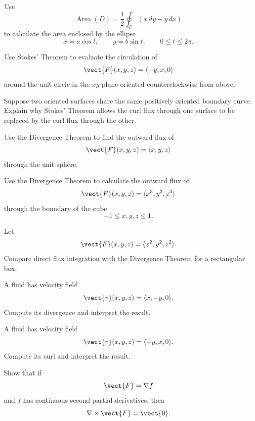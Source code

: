 \begin{exercise}[3]
Use
\[ \operatorname{Area}(D)
=
\frac12\oint_C(x\,dy-y\,dx) \]
to calculate the area enclosed by the ellipse
\[ x=a\cos t,\qquad y=b\sin t,\qquad0\leq t\leq2\pi. \]
\end{exercise}

\begin{exercise}[2]
Use Stokes' Theorem to evaluate the circulation of
\[ \vect{F}(x,y,z)=\langle-y,x,0\rangle \]
around the unit circle in the \(xy\)-plane oriented counterclockwise from
above.
\end{exercise}

\begin{exercise}[2]
Suppose two oriented surfaces share the same positively oriented boundary
curve. Explain why Stokes' Theorem allows the curl flux through one surface
to be replaced by the curl flux through the other.
\end{exercise}

\begin{exercise}[2]
Use the Divergence Theorem to find the outward flux of
\[ \vect{F}(x,y,z)=\langle x,y,z\rangle \]
through the unit sphere.
\end{exercise}

\begin{exercise}[2]
Use the Divergence Theorem to calculate the outward flux of
\[ \vect{F}(x,y,z)=\langle x^3,y^3,z^3\rangle \]
through the boundary of the cube
\[ -1\leq x,y,z\leq1. \]
\end{exercise}

\begin{exercise}[3]
Let
\[ \vect{F}(x,y,z)=\langle x^2,y^2,z^2\rangle. \]
Compare direct flux integration with the Divergence Theorem for a rectangular
box.
\end{exercise}

\begin{exercise}[3]
A fluid has velocity field
\[ \vect{v}(x,y,z)=\langle x,-y,0\rangle. \]
Compute its divergence and interpret the result.
\end{exercise}

\begin{exercise}[3]
A fluid has velocity field
\[ \vect{v}(x,y,z)=\langle-y,x,0\rangle. \]
Compute its curl and interpret the result.
\end{exercise}

\begin{exercise}[3]
Show that if
\[ \vect{F}=\nabla f \]
and \(f\) has continuous second partial derivatives, then
\[ \nabla\times\vect{F}=\vect{0}. \]
\end{exercise}


